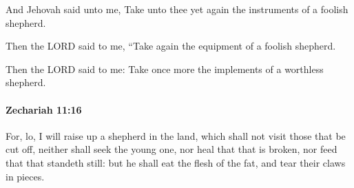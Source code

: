 			\begin{versebox}
					\item[BHS] 
					\item[LXX] 
					\item[ASV] And Jehovah said unto me, Take unto thee yet again the instruments of a foolish shepherd.
					\item[NIV] Then the LORD said to me, “Take again the equipment of a foolish shepherd.
					\item[NRSV] Then the LORD said to me: Take once more the implements of a worthless shepherd.
			\end{versebox}

		\paragraph{Zechariah 11:16} %
			\label{ZECHARIAH-11-16}

			For, lo, I will raise up a shepherd in the land, which shall not visit those that be cut off, neither shall seek the young one, nor heal that that is broken, nor feed that that standeth still: but he shall eat the flesh of the fat, and tear their claws in pieces.

